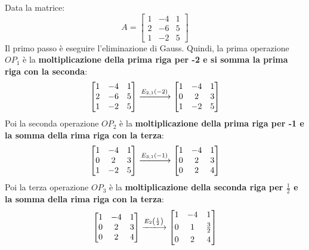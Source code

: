 \documentclass[a4paper]{article}
\makeatletter
\newenvironment{rowequmatbra}[1]{\left[\array{@{}#1@{}}}{\endarray\right]}
\makeatother
\begin{document}
	Data la matrice:
	\begin{equation*}
		A = \begin{bmatrix}
			1 & -4 & 1 \\
			2 & -6 & 5 \\
			1 & -2 & 5
		\end{bmatrix}
	\end{equation*}
	Il \textcolor{Red3}{primo passo} è eseguire l'eliminazione di Gauss. Quindi, la prima operazione $OP_{1}$ è la \textbf{moltiplicazione della prima riga per -2 e si somma la prima riga con la seconda}:
	\begin{equation*}
		\begin{rowequmatbra}{ccc}
			1 & -4 & 1 \\
			2 & -6 & 5 \\
			1 & -2 & 5
		\end{rowequmatbra} \xlongrightarrow{E_{2,1}\left(-2\right)}
		\begin{rowequmatbra}{ccc}
			1 & -4 & 1 \\
			0 &  2 & 3 \\
			1 & -2 & 5
		\end{rowequmatbra}
	\end{equation*}
	Poi la seconda operazione $OP_{2}$ è la \textbf{moltiplicazione della prima riga per -1 e la somma della rima riga con la terza}:
	\begin{equation*}
		\begin{rowequmatbra}{ccc}
			1 & -4 & 1 \\
			0 &  2 & 3 \\
			1 & -2 & 5
		\end{rowequmatbra} \xlongrightarrow{E_{3,1}\left(-1\right)}
		\begin{rowequmatbra}{ccc}
			1 & -4 & 1 \\
			0 &  2 & 3 \\
			0 &  2 & 4
		\end{rowequmatbra}
	\end{equation*}
	Poi la terza operazione $OP_{3}$ è la \textbf{moltiplicazione della seconda riga per $\frac{1}{2}$ e la somma della rima riga con la terza}:
	\begin{equation*}
		\begin{rowequmatbra}{ccc}
			1 & -4 & 1 \\
			0 &  2 & 3 \\
			0 &  2 & 4
		\end{rowequmatbra} \xlongrightarrow{E_{2}\left(\frac{1}{2}\right)}
		\begin{rowequmatbra}{ccc}
			1 & -4 & 1 \\ [0.3em]
			0 &  1 & \frac{3}{2} \\ [0.3em]
			0 &  2 & 4
		\end{rowequmatbra}
	\end{equation*}
\end{document}
